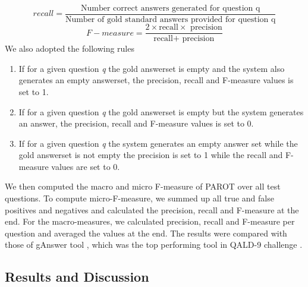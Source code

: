 \documentclass[review]{elsarticle}
\begin{document}
  \begin{equation}
 recall=\frac{\mbox{Number correct  answers generated for question q}}{\mbox{Number of gold standard answers provided for question q}}
 \end{equation}
  \begin{equation}
 F-measure=\frac{\mbox{2$\times$recall$\times$ precision}}{\mbox{recall$+$ precision}}
 \end{equation}
  We also adopted the following rules
 \begin{enumerate}
 \item If for a given question \textit{q} the gold  answerset is empty and the system also generates  an empty answerset, the precision, recall and F-measure values is set to 1.
\item If for a given question \textit{q} the gold answerset is empty but the system generates an answer, the  precision, recall and F-measure values is set to 0.
\item If  for a given question \textit{q} the system generates an empty answer set while  the gold answerset is not empty  the  precision is set to 1 while  the recall and F-measure values are set to 0.
 \end{enumerate}
We  then computed the macro and micro F-measure of PAROT
over all test questions. To compute  micro-F-measure, we summed up all true and false positives and negatives and calculated the precision, recall and F-measure at the end. For the macro-measures, we calculated precision, recall and F-measure per question and averaged the values at the end.  The results were compared with those of  gAnswer tool \citep{g2018}, which was the top performing tool in QALD-9 challenge \citep{quad9}.
\subsection{Results and Discussion}
\end{document}
